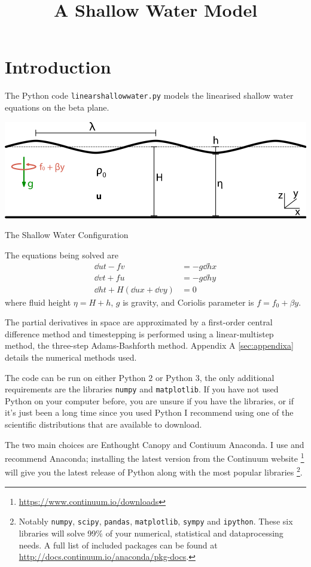\documentclass[a4paper, sfsidenotes, twoside]{tufte-handout}
\title{A Shallow Water Model}
\begin{document}
  \section{Introduction}
  \label{sec:Introduction}
  The Python code \texttt{linearshallowwater.py} models the linearised shallow
  water equations on the beta plane.
  \begin{marginfigure}[1in]
    \includegraphics{shallow_water}
    \caption{The Shallow Water Configuration}
    \label{fig:shallow}
  \end{marginfigure}
  The equations being solved are
  \begin{subequations}
    \label{eqn:sw}
    \begin{align}
      \dd{u}{t} - fv &= - g \dd{h}{x} \\
      \dd{v}{t} + fu &= - g \dd{h}{y} \\
      \dd{h}{t} + H(\dd{u}{x} + \dd{v}{y}) &= 0
    \end{align}
  \end{subequations}
  where fluid height $\eta = H + h$, $g$ is gravity, and Coriolis parameter is $f=f_0 + \beta y$.

  The partial derivatives in space are approximated by a first-order central
  difference method and timestepping is performed using a linear-multistep method,
  the three-step Adams-Bashforth method.
  Appendix A \ref{sec:appendixa} details the numerical methods used.

  The code can be run on either Python 2 or Python 3, the only additional requirements are the libraries \texttt{numpy} and \texttt{matplotlib}.
  If you have not used Python on your computer before, you are unsure if you have the libraries, or if it's just been a long time since you used Python I recommend using one of the scientific distributions that are available to download.

  The two main choices are Enthought Canopy and Contiuum Anaconda.
  I use and recommend Anaconda; installing the latest version from the Continuum website \footnote{\url{https://www.continuum.io/downloads}} will give you the latest release of Python along with the most popular libraries \footnote{Notably \texttt{numpy}, \texttt{scipy}, \texttt{pandas}, \texttt{matplotlib}, \texttt{sympy} and \texttt{ipython}.  These six libraries will solve 99\% of your numerical, statistical and dataprocessing needs.
  A full list of included packages can be found at \url{http://docs.continuum.io/anaconda/pkg-docs}.}.
\end{document}
